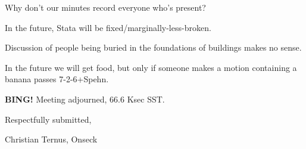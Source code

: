 \documentclass[10pt]{article}
\newcommand{\bing}{{\bf BING!} }
\begin{document}
Why don't our minutes record everyone who's present?  

In the future, Stata will be fixed/marginally-less-broken.  

Discussion of people being buried in the foundations of buildings makes no sense.

In the future we will get food, but only if someone makes a motion containing a banana passes 7-2-6+Spehn.

\bing
\noindent
Meeting adjourned, 66.6 Ksec SST.

\vspace{18pt}

\centerline{Respectfully submitted,}
\centerline{Christian Ternus, Onseck}
\end{document}
